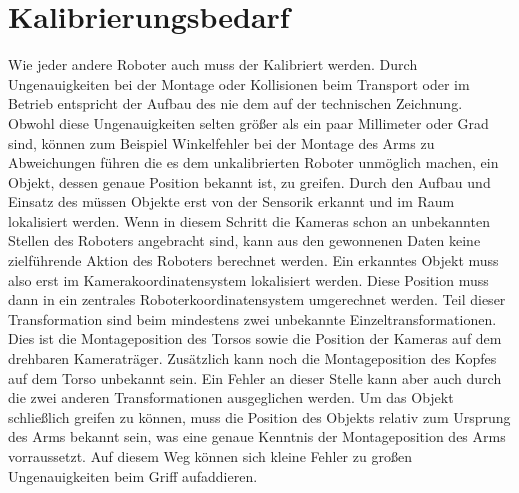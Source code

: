 \section{Kalibrierungsbedarf} %
\label{sec:Kalibrierungsbedarf}
Wie jeder andere Roboter auch muss der \cob Kalibriert werden. Durch Ungenauigkeiten bei 
der Montage oder Kollisionen beim Transport oder im Betrieb entspricht der Aufbau des \cob
nie dem auf der technischen Zeichnung. Obwohl diese Ungenauigkeiten selten größer als ein 
paar Millimeter oder Grad sind, können zum Beispiel Winkelfehler bei der Montage des Arms 
zu Abweichungen führen die es dem unkalibrierten Roboter unmöglich machen, ein Objekt, dessen
genaue Position bekannt ist, zu greifen. Durch den Aufbau und Einsatz des \cob müssen 
Objekte erst von der Sensorik erkannt und im Raum lokalisiert werden. Wenn in diesem Schritt 
die Kameras schon an unbekannten Stellen des Roboters angebracht sind, kann aus den gewonnenen
Daten keine zielführende Aktion des Roboters berechnet werden. Ein erkanntes Objekt muss also 
erst im Kamerakoordinatensystem lokalisiert werden. Diese Position muss dann in ein zentrales 
Roboterkoordinatensystem umgerechnet werden. Teil dieser Transformation sind beim \cob mindestens
zwei unbekannte Einzeltransformationen. Dies ist die Montageposition des Torsos sowie die 
Position der Kameras auf dem drehbaren Kameraträger. Zusätzlich kann noch die Montageposition
des Kopfes auf dem Torso unbekannt sein. Ein Fehler an dieser Stelle kann aber auch durch die
zwei anderen Transformationen ausgeglichen werden. Um das Objekt schließlich greifen zu können,
muss die Position des Objekts relativ zum Ursprung des Arms bekannt sein, was eine genaue
Kenntnis der Montageposition des Arms vorraussetzt. Auf diesem Weg können sich kleine Fehler
zu großen Ungenauigkeiten beim Griff aufaddieren.

